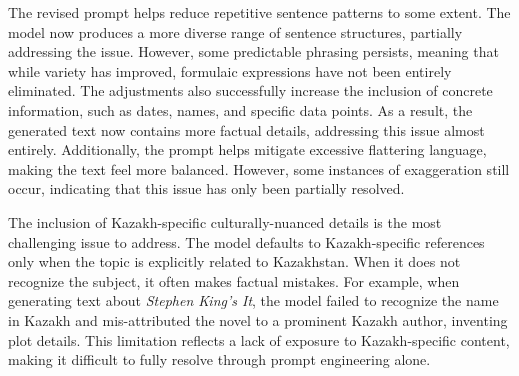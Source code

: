 The revised prompt helps reduce repetitive sentence patterns to some extent. The model now produces a more diverse range of sentence structures, partially addressing the issue. However, some predictable phrasing persists, meaning that while variety has improved, formulaic expressions have not been entirely eliminated. The adjustments also successfully increase the inclusion of concrete information, such as dates, names, and specific data points. As a result, the generated text now contains more factual details, addressing this issue almost entirely. Additionally, the prompt helps mitigate excessive flattering language, making the text feel more balanced. However, some instances of exaggeration still occur, indicating that this issue has only been partially resolved.

The inclusion of Kazakh-specific culturally-nuanced details is the most challenging issue to address. The model defaults to Kazakh-specific references only when the topic is explicitly related to Kazakhstan. When it does not recognize the subject, it often makes factual mistakes. For example, when generating text about \textit{Stephen King's It}, the model failed to recognize the name in Kazakh and mis-attributed the novel to a prominent Kazakh author, inventing plot details. This limitation reflects a lack of exposure to Kazakh-specific content, making it difficult to fully resolve through prompt engineering alone.





